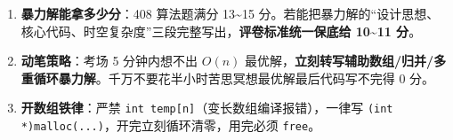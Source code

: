 \documentclass[10pt,a4paper]{ctexart}
\begin{document}

\begin{enumerate}

\item \textbf{暴力解能拿多少分}：408 算法题满分 13\textasciitilde{}15 分。若能把暴力解的“设计思想、核心代码、时空复杂度”三段完整写出，\textbf{评卷标准统一保底给 10\textasciitilde{}11 分}。

\item \textbf{动笔策略}：考场 5 分钟内想不出 $O(n)$ 最优解，\textbf{立刻转写辅助数组/归并/多重循环暴力解}。千万不要花半小时苦思冥想最优解最后代码写不完得 0 分。

\item \textbf{开数组铁律}：严禁 \texttt{int temp[n]}（变长数组编译报错），一律写 \texttt{(int *)malloc(...)}，开完立刻循环清零，用完必须 \texttt{free}。

\end{enumerate}
\end{document}
